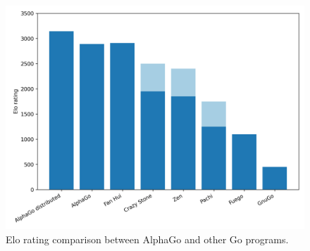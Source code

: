 \begin{figure}[htbp]
    \centering
    \includegraphics[width=\linewidth, keepaspectratio]{sections/4AlphaGo/comparison.png}
    \caption{Elo rating comparison between AlphaGo and other Go programs.}
\end{figure}

